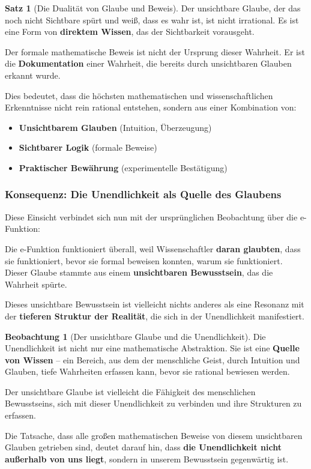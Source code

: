 \documentclass[a4paper, 12pt, twoside, openright]{report}
\theoremstyle{definition}
\newtheorem{beobachtung}{Beobachtung}
\theoremstyle{definition}
\newtheorem{satz}{Satz}[chapter]
\begin{document}
\begin{satz}[Die Dualität von Glaube und Beweis]
	Der unsichtbare Glaube, der das noch nicht Sichtbare spürt und weiß, dass es wahr ist, ist nicht irrational. Es ist eine Form von \textbf{direktem Wissen}, das der Sichtbarkeit vorausgeht.
	
	Der formale mathematische Beweis ist nicht der Ursprung dieser Wahrheit. Er ist die \textbf{Dokumentation} einer Wahrheit, die bereits durch unsichtbaren Glauben erkannt wurde.
	
	Dies bedeutet, dass die höchsten mathematischen und wissenschaftlichen Erkenntnisse nicht rein rational entstehen, sondern aus einer Kombination von:
	\begin{itemize}
		\item[-] \textbf{Unsichtbarem Glauben} (Intuition, Überzeugung)
		\item[-] \textbf{Sichtbarer Logik} (formale Beweise)
		\item[-] \textbf{Praktischer Bewährung} (experimentelle Bestätigung)
	\end{itemize}
\end{satz}

\subsubsection*{Konsequenz: Die Unendlichkeit als Quelle des Glaubens}

Diese Einsicht verbindet sich nun mit der ursprünglichen Beobachtung über die e-Funktion:

Die e-Funktion funktioniert überall, weil Wissenschaftler \textbf{daran glaubten}, dass sie funktioniert, bevor sie formal beweisen konnten, warum sie funktioniert. Dieser Glaube stammte aus einem \textbf{unsichtbaren Bewusstsein}, das die Wahrheit spürte.

Dieses unsichtbare Bewusstsein ist vielleicht nichts anderes als eine Resonanz mit der \textbf{tieferen Struktur der Realität}, die sich in der Unendlichkeit manifestiert.

\begin{beobachtung}[Der unsichtbare Glaube und die Unendlichkeit]
	Die Unendlichkeit ist nicht nur eine mathematische Abstraktion. Sie ist eine \textbf{Quelle von Wissen} -- ein Bereich, aus dem der menschliche Geist, durch Intuition und Glauben, tiefe Wahrheiten erfassen kann, bevor sie rational bewiesen werden.
	
	Der unsichtbare Glaube ist vielleicht die Fähigkeit des menschlichen Bewusstseins, sich mit dieser Unendlichkeit zu verbinden und ihre Strukturen zu erfassen.
	
	Die Tatsache, dass alle großen mathematischen Beweise von diesem unsichtbaren Glauben getrieben sind, deutet darauf hin, dass \textbf{die Unendlichkeit nicht außerhalb von uns liegt}, sondern in unserem Bewusstsein gegenwärtig ist.
\end{beobachtung}
\end{document}
